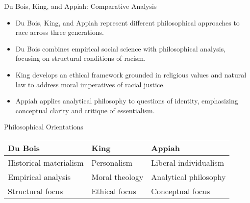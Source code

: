 \documentclass{beamer}
\begin{document}
	\begin{frame}{Du Bois, King, and Appiah: Comparative Analysis}
		\begin{itemize}
			\item Du Bois, King, and Appiah represent different philosophical approaches to race across three generations.
			\item Du Bois combines empirical social science with philosophical analysis, focusing on structural conditions of racism.
			\item King develops an ethical framework grounded in religious values and natural law to address moral imperatives of racial justice.
			\item Appiah applies analytical philosophy to questions of identity, emphasizing conceptual clarity and critique of essentialism.
		\end{itemize}
		
		\begin{alertblock}{Philosophical Orientations}
			\begin{tabular}{|l|l|l|}
				\hline
				\textbf{Du Bois} & \textbf{King} & \textbf{Appiah} \\
				\hline
				Historical materialism & Personalism & Liberal individualism \\
				Empirical analysis & Moral theology & Analytical philosophy \\
				Structural focus & Ethical focus & Conceptual focus \\
				\hline
			\end{tabular}
		\end{alertblock}
	\end{frame}
	
\end{document}
